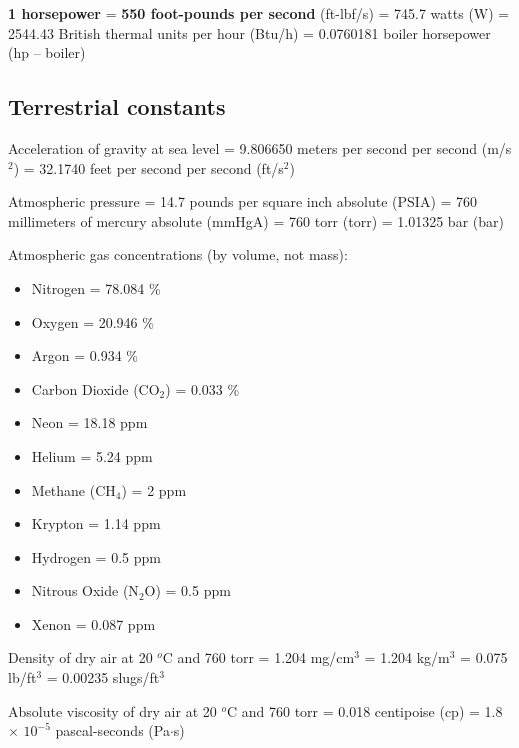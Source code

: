 \vskip 10pt

\noindent 
\textbf{1 horsepower} = \textbf{550 foot-pounds per second} (ft-lbf/s) = 745.7 watts (W) = 2544.43 British thermal units per hour (Btu/h) = 0.0760181 boiler horsepower (hp -- boiler)





\filbreak
\subsection{Terrestrial constants}

\noindent 
Acceleration of gravity at sea level = 9.806650 meters per second per second (m/s$^{2}$) = 32.1740 feet per second per second (ft/s$^{2}$)

\vskip 5pt

\noindent 
Atmospheric pressure = 14.7 pounds per square inch absolute (PSIA) = 760 millimeters of mercury absolute (mmHgA) = 760 torr (torr) = 1.01325 bar (bar)

\vskip 5pt

\noindent 
Atmospheric gas concentrations (by volume, not mass):

\begin{itemize}
\item Nitrogen = 78.084 \%
\item Oxygen = 20.946 \%
\item Argon = 0.934 \%
\item Carbon Dioxide (CO$_{2}$) = 0.033 \%
\item Neon = 18.18 ppm
\item Helium = 5.24 ppm
\item Methane (CH$_{4}$) = 2 ppm
\item Krypton = 1.14 ppm
\item Hydrogen = 0.5 ppm
\item Nitrous Oxide (N$_{2}$O) = 0.5 ppm
\item Xenon = 0.087 ppm
\end{itemize}

\vskip 10pt

\noindent
Density of dry air at 20 $^{o}$C and 760 torr = 1.204 mg/cm$^{3}$ = 1.204 kg/m$^{3}$ = 0.075 lb/ft$^{3}$ = 0.00235 slugs/ft$^{3}$

\vskip 5pt

\noindent
Absolute viscosity of dry air at 20 $^{o}$C and 760 torr = 0.018 centipoise (cp) = 1.8 $\times$ $10^{-5}$ pascal-seconds (Pa$\cdot$s)







